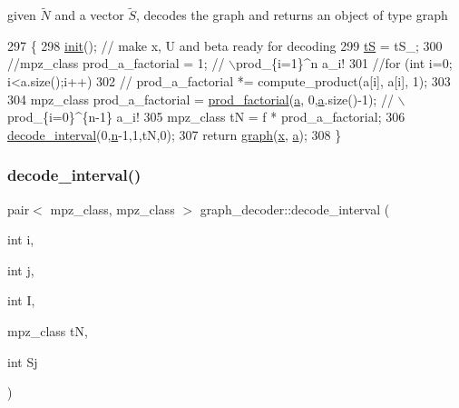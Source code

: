 given $\tilde{N}$ and a vector $\tilde{S}$, decodes the graph and returns an object of type graph 


\begin{DoxyCode}
297 \{
298   \hyperlink{classgraph__decoder_a97a9dcd5af21ece86fa91adcb41ca9cc}{init}(); \textcolor{comment}{// make x, U and beta ready for decoding }
299   \hyperlink{classgraph__decoder_ac466636b9b21122f4fa0246aa624978c}{tS} = tS\_;
300   \textcolor{comment}{//mpz\_class prod\_a\_factorial = 1; // \(\backslash\)prod\_\{i=1\}^n a\_i!}
301   \textcolor{comment}{//for (int i=0; i<a.size();i++)}
302   \textcolor{comment}{//  prod\_a\_factorial *= compute\_product(a[i], a[i], 1);}
303 
304   mpz\_class prod\_a\_factorial = \hyperlink{compression__helper_8cpp_a86d8a20e022dc06b23df3b08ac10b7d1}{prod\_factorial}(\hyperlink{classgraph__decoder_a9dd7c3c11b8a45a12cb7c3c2d2bfa2cc}{a}, 0,\hyperlink{classgraph__decoder_a9dd7c3c11b8a45a12cb7c3c2d2bfa2cc}{a}.size()-1); \textcolor{comment}{// \(\backslash\)prod\_\{i=0\}^\{n-1\} a\_i!}
305   mpz\_class tN = f * prod\_a\_factorial;
306   \hyperlink{classgraph__decoder_a2cb0bd279889a833d4c825e99eb72410}{decode\_interval}(0,\hyperlink{classgraph__decoder_a6bc1e72b2f7a913d14b789a6c2d92c1e}{n}-1,1,tN,0);
307   \textcolor{keywordflow}{return} \hyperlink{classgraph}{graph}(\hyperlink{classgraph__decoder_aa3f2776afe387668cf7f68109428e14e}{x}, \hyperlink{classgraph__decoder_a9dd7c3c11b8a45a12cb7c3c2d2bfa2cc}{a});
308 \}
\end{DoxyCode}
\mbox{\label{classgraph__decoder_a2cb0bd279889a833d4c825e99eb72410}} 
\subsubsection{\texorpdfstring{decode\+\_\+interval()}{decode\_interval()}}
{\footnotesize\ttfamily pair$<$ mpz\+\_\+class, mpz\+\_\+class $>$ graph\+\_\+decoder\+::decode\+\_\+interval (\begin{DoxyParamCaption}\item[{int}]{i,  }\item[{int}]{j,  }\item[{int}]{I,  }\item[{mpz\+\_\+class}]{tN,  }\item[{int}]{Sj }\end{DoxyParamCaption})}



